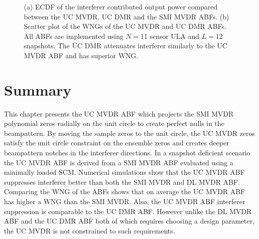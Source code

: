 \begin{figure}[!hp]
  \centering
  \centering

  \caption[Output power comparison between UC MVDR and UC DMR]{(a)
    ECDF of the interferer contributed output power compared between
    the UC MVDR, UC DMR and the SMI MVDR ABFs. (b) Scatter plot of the
    WNGs of the UC MVDR and UC DMR ABFs. All ABFs are implemented
    using $N = 11$ sensor ULA and $L = 12$ snapshots. The UC DMR attenuates interferer similarly to the UC MVDR ABF and has superior WNG.}
  \label{fig:uc-mvdr-dmr-pout}
\end{figure}

\section{Summary}
\label{sec:ch3-summary}
This chapter presents the UC MVDR ABF which projects the SMI MVDR
polynomial zeros radially on the unit circle to create perfect nulls
in the beampattern. By moving the sample zeros to the
unit circle, the UC MVDR zeros satisfy the unit circle constraint on
the ensemble zeros and creates deeper beampattern notches in the
interferer directions. In a snapshot deficient scenario the UC MVDR
ABF is derived from a SMI MVDR ABF evaluated using a minimally loaded
SCM. Numerical simulations show that the UC MVDR ABF suppresses
interferer better than both the SMI MVDR and DL MVDR ABF. Comparing
the WNG of the ABFs shows that on average the UC MVDR ABF has
higher a WNG than the SMI MVDR. Also, the UC MVDR ABF interferer
suppression is comparable to the UC DMR ABF. However unlike the DL MVDR ABF and the UC DMR ABF both of which requires choosing a design parameter,
the UC MVDR is not constrained to such requirements.
